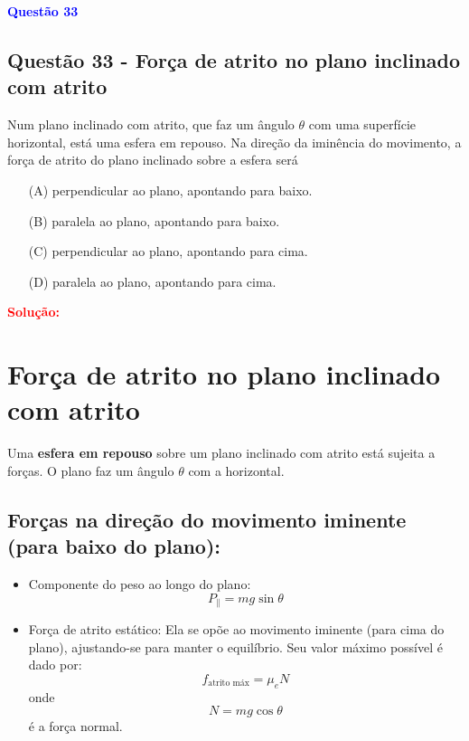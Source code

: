 \documentclass[a4paper,12pt]{article}
\begin{document}
\begin{flushleft}
\textbf{\textcolor{blue}{\Large Quest\~ao 33}}\\
\noindent
\subsection{Quest\~ao 33 - For\c{c}a de atrito no plano inclinado com atrito}
Num plano inclinado com atrito, que faz um ângulo $\theta$ com
uma superfície horizontal, está uma esfera em repouso. Na
direção da iminência do movimento, a força de atrito do
plano inclinado sobre a esfera será

\begin{itemize}
\item[(A)] perpendicular ao plano, apontando para baixo.
\item[(B)] paralela ao plano, apontando para baixo.
\item[(C)] perpendicular ao plano, apontando para cima.
\item[(D)] paralela ao plano, apontando para cima.
\end{itemize}

\vspace{0.5cm}

\textcolor{red}{\textbf{Solução:}}\\

\section*{Força de atrito no plano inclinado com atrito}

Uma \textbf{esfera em repouso} sobre um plano inclinado com atrito está sujeita a forças.  
O plano faz um ângulo \( \theta \) com a horizontal.

\subsection*{Forças na direção do movimento iminente (para baixo do plano):}

\begin{itemize}
  \item Componente do peso ao longo do plano:
  \begin{equation*}
    P_{\parallel} = mg \sin\theta
  \end{equation*}

  \item Força de atrito estático:  
  Ela se opõe ao movimento iminente (para cima do plano), ajustando-se para manter o equilíbrio.  
  Seu valor máximo possível é dado por:
  \begin{equation*}
    f_{\text{atrito máx}} = \mu_e N
  \end{equation*}
  onde
  \begin{equation*}
    N = mg \cos\theta
  \end{equation*}
  é a força normal.
\end{itemize}


\end{flushleft}
\end{document}
